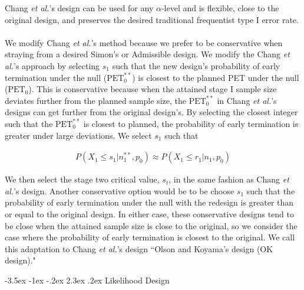 \documentclass[12pt]{report}\usepackage[]{graphicx}\usepackage[]{color}
\makeatletter
\newlength{\li}\setlength{\li}{14.48pt}
\newlength{\di}\setlength{\di}{-3.5mm}
\renewcommand\section{ \@startsection {section}{1}{\z@}%
                                   {-3.5ex \@plus -1ex \@minus -.2ex}%
                                   {2.3ex \@plus.2ex}%
                                   {\centering\large\fontfamily{qcs}\selectfont}}
\makeatother
\begin{document}
Chang \textit{et al.}'s design can be used for any $\alpha$-level and is flexible, close to the original design, and preserves the desired traditional frequentist type I error rate. \\
\\
\indent We modify Chang \textit{et al.}'s method because we prefer to be conservative when straying from a desired Simon's or Admissible design. We modify the Chang \textit{et al.}'s approach by selecting $s_1$ such that the new design's probability of early termination under the null ($\mbox{PET}_0^{\ast\ast}$) is closest to the planned PET under the null ($\mbox{PET}_0$). This is conservative because when the attained stage I sample size deviates further from the planned sample size, the $\mbox{PET}_0^{\ast\ast}$ in Chang \textit{et al.}'s designs can get further from the original design's. By selecting the closest integer such that the $\mbox{PET}_0^{\ast\ast}$ is closest to planned, the probability of early termination is greater under large deviations. We select $s_1$ such that 

\begin{equation}
\begin{aligned}
P(X_1 \leq s_1 | n_1^{\ast\ast}, p_0) \approx P(X_1 \leq r_1 | n_1, p_0)
\end{aligned}
\end{equation}

We then select the stage two critical value, $s_t$, in the same fashion as Chang \textit{et al.}'s design. Another conservative option would be to be choose $s_1$ such that the probability of early termination under the null with the redesign is greater than or equal to the original design. In either case, these conservative designs tend to be close when the attained sample size is close to the original, so we consider the case where the probability of early termination is closest to the original. We call this adaptation to Chang \textit{et al.}'s design ``Olson and Koyama's design (OK design)." 

\section{Likelihood Design}
\end{document}
